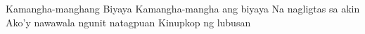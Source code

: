 Kamangha-manghang Biyaya
Kamangha-mangha ang biyaya
Na nagligtas sa akin
Ako’y nawawala ngunit natagpuan
Kinupkop ng lubusan 

